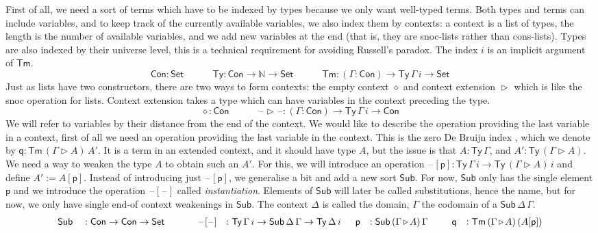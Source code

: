 \documentclass[submission,copyright,creativecommons]{eptcs}
\newcommand{\ra}{\rightarrow}
\newcommand{\Set}{\mathsf{Set}}
\newcommand{\Ty}{\mathsf{Ty}}
\newcommand{\Tm}{\mathsf{Tm}}
\newcommand{\Con}{\mathsf{Con}}
\newcommand{\Sub}{\mathsf{Sub}}
\newcommand{\p}{\mathsf{p}}
\newcommand{\q}{\mathsf{q}}
\newcommand{\ext}{\mathop{\triangleright}}
\newcommand{\N}{\mathbb{N}}
\newcommand{\blank}{\mathord{\hspace{1pt}\text{--}\hspace{1pt}}} %
\begin{document}
First of all, we need a sort of terms which have to be indexed by
types because we only want well-typed terms. Both types and terms can
include variables, and to keep track of the currently available
variables, we also index them by contexts: a context is a list of
types, the length is the number of available variables, and we add new
variables at the end (that is, they are snoc-lists rather than
cons-lists). Types are also indexed by their universe level, this is a
technical requirement for avoiding Russell's paradox. The index $i$ is
an implicit argument of $\Tm$.
\begin{equation*}
\Con : \Set \hspace{3em} 
\Ty : \Con\ra\N\ra\Set \hspace{3em} 
\Tm : (\Gamma:\Con)\ra\Ty\,\Gamma\,i\ra\Set
\end{equation*}
Just as lists have two constructors, there are two ways to form
contexts: the empty context $\diamond$ and context extension $\ext$
which is like the snoc operation for lists. Context extension takes a
type which can have variables in the context preceding the type.
\[
\diamond : \Con \hspace{3em}
\blank\ext\blank : (\Gamma:\Con)\ra\Ty\,\Gamma\,i\ra\Con
\]
We will refer to variables by their distance from the end of the
context. We would like to describe the operation providing the last
variable in a context, first of all we need an operation providing the last
variable in the context. This is the zero De Bruijn index \cite{DEBRUIJN1972381}, which we
denote by $\q : \Tm\,(\Gamma\ext A)\,A'$. It is a term in an
extended context, and it should have type $A$, but the issue is that
$A : \Ty\,\Gamma$, and $A' : \Ty\,(\Gamma\ext A)$. We need a way to
weaken the type $A$ to obtain such an $A'$. For this, we will
introduce an operation $\blank[\p] : \Ty\,\Gamma\,i\ra\Ty\,(\Gamma\ext
A)\,i$ and define $A' := A[\p]$. Instead of introducing just
$\blank[\p]$, we generalise a bit and add a new sort $\Sub$. For
now, $\Sub$ only has the single element $\p$ and we introduce the operation
$\blank[\blank]$ called \emph{instantiation}. Elements of $\Sub$
will later be called substitutions, hence the name, but for now, we
only have single end-of context weakenings in $\Sub$. The context
$\Delta$ is called the domain, $\Gamma$ the codomain of a
$\Sub\,\Delta\,\Gamma$.
\begin{alignat*}{10}
  & \Sub && : \Con\ra\Con\ra\Set &&\hspace{1.5em}
  & \blank[\blank] && : \Ty\,\Gamma\,i\ra\Sub\,\Delta\,\Gamma\ra\Ty\,\Delta\,i \hspace{1.5em}
  \p && : \Sub\,(\Gamma\ext A)\,\Gamma \hspace{1.5em}
  && \q && : \Tm\,(\Gamma\ext A)\,(A[\p])
\end{alignat*}
\end{document}
